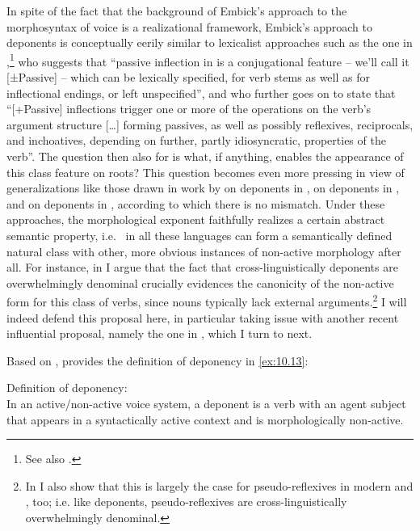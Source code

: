 \documentclass[output=paper]{langsci/langscibook}
\begin{document}
In spite of the fact that the background of Embick’s approach to the
morphosyntax of voice is a realizational framework, Embick’s approach to
deponents is conceptually eerily similar to lexicalist approaches such as the
one in \citet[121--122]{Kiparsky2005},\footnote{See also
\citet{SadlerSpencer2001}.} who suggests that “passive inflection in  is a
conjugational feature -- we’ll call it [±Passive] -- which can be lexically
specified, for verb stems as well as for inflectional endings, or left
unspecified”, and who further goes on to state that “[+Passive] inflections
trigger one or more of the operations on the verb’s argument structure [\dots]
forming passives, as well as possibly reflexives, reciprocals, and inchoatives,
depending on further, partly idiosyncratic, properties of the verb”. The
question then also for \citeauthor{Embick1997} is what, if anything, enables
the appearance of this class feature on roots? This question becomes even more
pressing in view of generalizations like those drawn in work by
\textcite{Xuetal2007} on deponents in , \citet{Kallulli2013} on deponents
in , and \citet{ZomAle2014} on deponents in , according to which
there is no mismatch. Under these approaches, the morphological exponent
faithfully realizes a certain abstract semantic property, i.e.\ 
in all these languages can form a semantically defined natural class with
other, more obvious instances of non-active morphology after all.  For
instance, in \citet{Kallulli2013} I argue that the fact that
cross-linguistically deponents are overwhelmingly denominal crucially evidences
the canonicity of the non-active form for this class of verbs, since nouns
typically lack external arguments.\footnote{In \citet{Kallulli2013} I also show
    that this is largely the case for pseudo-reflexives in modern  and
    , too; i.e.  like deponents, pseudo-reflexives are
cross-linguistically overwhelmingly denominal.} I will indeed defend this
proposal here, in particular taking issue with another recent influential
proposal, namely the one in \citet{Grestenberger2014,Grestenberger2018a}, which
I turn to next.\largerpage[-3]

Based on \citet{Grestenberger2014}, \textcite{Grestenberger2018a} provides the
definition of deponency in \eqref{ex:10.13}:

\ea%
    \label{ex:10.13} Definition of deponency:\\
    In an active/non-active voice system, a deponent is a verb with an agent
    subject that appears in a syntactically active context and is
    morpho\-lo\-gi\-cal\-ly non-active.
\z
\end{document}
